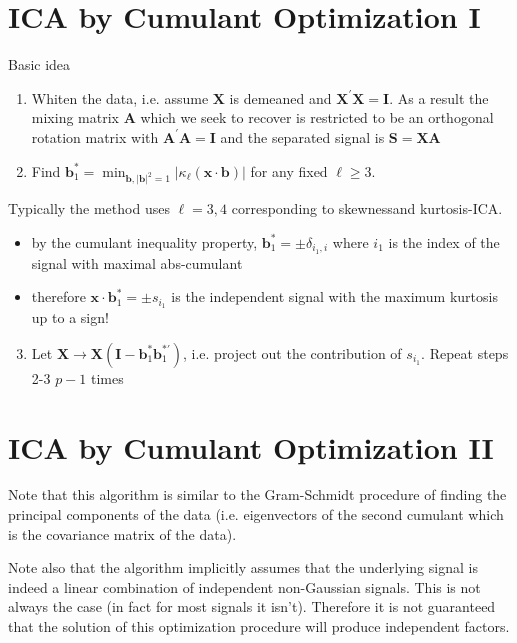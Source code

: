 \documentclass[11pt]{article}
\theoremstyle{plain} %
\theoremstyle{remark}
\begin{document}
\section*{ICA by Cumulant Optimization I}
Basic idea

\begin{enumerate}
  \item Whiten the data, i.e. assume $\mathbf{X}$ is demeaned and
  $\mathbf{X}^{\prime} \mathbf{X}=\mathbf{I}$. As a result the mixing matrix
  $\mathbf{A}$ which we seek to recover is restricted to be an orthogonal
  rotation matrix with $\mathbf{A}^{\prime} \mathbf{A}=\mathbf{I}$ and the
  separated signal is $\mathbf{S}=\mathbf{X A}$

  \item Find $\mathbf{b}_{1}^{*}=\min
  _{\mathbf{b},|\mathbf{b}|^{2}=1}\left|\kappa_{\ell}(\mathbf{x} \cdot
  \mathbf{b})\right|$ for any fixed $\ell \geq 3$.

\end{enumerate}

Typically the method uses $\ell=3,4$ corresponding to skewnessand kurtosis-ICA.

\begin{itemize}
  \item by the cumulant inequality property, $\mathbf{b}_{1}^{*}= \pm
  \delta_{i_{1}, i}$ where $i_{1}$ is the index of the signal with maximal
  abs-cumulant
  \item therefore $\mathbf{x} \cdot \mathbf{b}_{1}^{*}= \pm s_{i_{1}}$ is the
  independent signal with the maximum kurtosis up to a sign!
\end{itemize}

\begin{enumerate}
  \setcounter{enumi}{2}
  \item Let $\mathbf{X} \rightarrow
  \mathbf{X}\left(\mathbf{I}-\mathbf{b}_{1}^{*} \mathbf{b}_{1}^{*
  \prime}\right)$, i.e. project out the contribution of $s_{i_{1}}$. Repeat
  steps 2-3 $p-1$ times
\end{enumerate}

\section*{ICA by Cumulant Optimization II}
Note that this algorithm is similar to the Gram-Schmidt procedure of finding the
principal components of the data (i.e. eigenvectors of the second cumulant which
is the covariance matrix of the data).

Note also that the algorithm implicitly assumes that the underlying signal is
indeed a linear combination of independent non-Gaussian signals. This is not
always the case (in fact for most signals it isn't). Therefore it is not
guaranteed that the solution of this optimization procedure will produce
independent factors.
\end{document}
